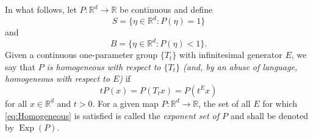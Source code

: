 \documentclass[11pt]{article}
\newcommand\Exp{\operatorname{Exp}}
\begin{document}
\noindent In what follows, let $P:\mathbb{R}^d\to\mathbb{R}$ be continuous and define
\begin{equation}
S=\{\eta\in\mathbb{R}^d:P(\eta)=1\}
\end{equation}
and
\begin{equation*}
B=\{\eta\in\mathbb{R}^d:P(\eta)<1\}.
\end{equation*}
Given a continuous one-parameter group $\{T_t\}$ with infinitesimal generator $E$, we say that \textit{$P$ is homogeneous with respect to $\{T_t\}$ (and, by an abuse of language, homogeneous with respect to $E$)} if
\begin{equation}\label{eq:Homogeneous}
tP(x)=P(T_tx)=P\left(t^Ex\right)
\end{equation}
for all $x\in\mathbb{R}^d$ and $t>0$. For a given map $P:\mathbb{R}^d\to\mathbb{R}$, the set of all $E$ for which \eqref{eq:Homogeneous} is satisfied is called the \textit{exponent set of $P$} and shall be denoted by $\Exp(P)$. 
\end{document}
